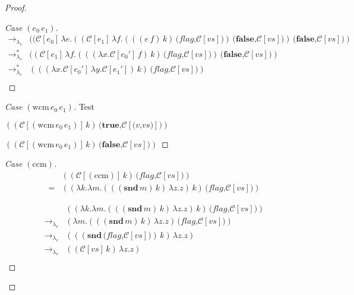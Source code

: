\documentclass[ms,electronic,twosidetoc,letterpaper,chaptercenter,parttop]{byumsphd}
\begin{document}
\begin{proof}
\begin{proof}[Case $(e_0\,e_1)$]
\begin{align*}
\rightarrow_{\lambda_v} &((\mathcal{C}[e_0]\,\lambda e.((\mathcal{C}[e_1]\,\lambda f.(((e\,f)\,k)\,\textbf{(}\textit{flag}\textbf{,}\mathcal{C}[vs]\textbf{)})\,\textbf{(}\textbf{false}\textbf{,}\mathcal{C}[vs]\textbf{)})\,\textbf{(}\textbf{false}\textbf{,}\mathcal{C}[vs]\textbf{)})\\
\rightarrow_{\lambda_v}^{*} &((\mathcal{C}[e_1]\,\lambda f.(((\lambda x.\mathcal{C}[e_0']\,f)\,k)\,\textbf{(}\textit{flag}\textbf{,}\mathcal{C}[vs]\textbf{)})\,\textbf{(}\textbf{false}\textbf{,}\mathcal{C}[vs]\textbf{)})\\
\rightarrow_{\lambda_v}^{*} &(((\lambda x.\mathcal{C}[e_0']\,\lambda y.\mathcal{C}[e_1'])\,k)\,\textbf{(}\textit{flag}\textbf{,}\mathcal{C}[vs]\textbf{)})\\
\end{align*}
\end{proof}

\begin{proof}[Case $(\mathrm{wcm}\,e_0\,e_1)$]

Test

$((\mathcal{C}[(\mathrm{wcm}\,e_0\,e_1)]\,k)\,\textbf{(}\textbf{true}\textbf{,}\mathcal{C}[\textbf{(}v\textbf{,}vs\textbf{)}]\textbf{)})$

$((\mathcal{C}[(\mathrm{wcm}\,e_0\,e_1)]\,k)\,\textbf{(}\textbf{false}\textbf{,}\mathcal{C}[vs]\textbf{)})$
\end{proof}

\begin{proof}[Case $(\mathrm{ccm})$]

\begin{align*}
  &((\mathcal{C}[(\mathrm{ccm})]\,k)\,\textbf{(}\textit{flag}\textbf{,}\mathcal{C}[vs]\textbf{)})\\
= &((\lambda k.\lambda m.(((\mathbf{snd}\,m)\,k)\,\lambda z.z)\,k)\,\textbf{(}\textit{flag}\textbf{,}\mathcal{C}[vs]\textbf{)})
\end{align*}

\begin{align*}
                        &((\lambda k.\lambda m.(((\mathbf{snd}\,m)\,k)\,\lambda z.z)\,k)\,\textbf{(}\textit{flag}\textbf{,}\mathcal{C}[vs]\textbf{)})\\
\rightarrow_{\lambda_v} &(\lambda m.(((\mathbf{snd}\,m)\,k)\,\lambda z.z)\,\textbf{(}\textit{flag}\textbf{,}\mathcal{C}[vs]\textbf{)})\\
\rightarrow_{\lambda_v} &(((\mathbf{snd}\,\textbf{(}\textit{flag}\textbf{,}\mathcal{C}[vs]\textbf{)})\,k)\,\lambda z.z)\\
\rightarrow_{\lambda_v} &((\mathcal{C}[vs]\,k)\,\lambda z.z)\\
\end{align*}


\end{proof}
\end{proof}
\end{document}
